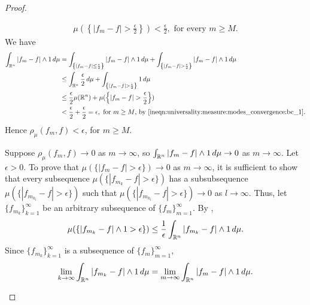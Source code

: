 \begin{proof}
\begin{step}[$b \Longrightarrow c$]
\begin{align}
     \label{ineqn:universality:measure:modes_convergence:bc_1}
     \mu (\left \{ | f_m - f | > \frac{\epsilon}{2} \right \}) < \frac{\epsilon}{2}, \text{ for every $m \geq M$.}
\end{align}
We have \begin{align*}
    \int_{{\mathbb R}^n} |f_m -f| \wedge 1 \, d\mu &=  \int_{\left \{ |f_m - f| \leq \frac{\epsilon}{2} \right \}} |f_m -f| \wedge 1  \, d\mu + \int_{\left \{ |f_m - f| > \frac{\epsilon}{2} \right \}} |f_m -f| \wedge 1  \, d\mu \\
                                          &\leq \int_{{\mathbb R}^n} \frac{\epsilon}{2} \, d\mu +   \int_{\left \{ | f_m - f | > \frac{\epsilon}{2} \right \}} 1 \, d\mu \\
                                          &\leq \frac{\epsilon}{2} \mu({\mathbb R}^n) + \mu (\left \{ | f_m - f | > \frac{\epsilon}{2}  \right \}) \\
                                          &< \frac{\epsilon}{2} + \frac{\epsilon}{2} = \epsilon, \text{ for $m \geq M$, by \ref{ineqn:universality:measure:modes_convergence:bc_1}}. 
\end{align*}
Hence $\rho_\mu (f_m, f) < \epsilon$, for $m \geq M$.
\end{step}
\begin{step}[$c \Longrightarrow b$]
Suppose $\rho_\mu (f_m, f) \to 0 $ as $m \to \infty$, so $\int_{{\mathbb R}^n} | f_m - f| \wedge 1 \, d\mu \to 0$ as $m \to \infty$. Let $\epsilon > 0$. To prove that $\mu(\{ |f_m - f| > \epsilon \}) \to 0$ as $m \to \infty$, it is sufficient to show that every subsequence $\mu(\{ |f_{m_k} - f| > \epsilon \}) $ has a subsubsequence $\mu(\{ |f_{m_{k_l}} - f| > \epsilon \})$ such that $\mu(\{ |f_{m_{k_l}} - f| > \epsilon \}) \to 0 $ as $l \to \infty$. Thus, let $\{ f_{m_k} \}_{k = 1}^\infty$ be an arbitrary subsequence of $\{ f_m \}_{m = 1}^\infty$. By ,
\begin{align}
    \label{eqn:universality:measure:modes_convergence:cb_1}
    \mu(\{ | f_{m_k} - f| \wedge 1 > \epsilon \}) \leq \frac{1}{\epsilon} \int_{{\mathbb R}^n} |f_{m_k} - f| \wedge 1 \, d\mu.
\end{align}
Since  $\{ f_{m_k} \}_{k = 1}^\infty$ is a subsequence of $\{ f_m \}_{m = 1}^\infty$, \begin{align}
    \label{eqn:universality:measure:modes_convergence:cb_2}
    \lim_{k \to \infty} \int_{\R^n}  |f_{m_k} - f| \wedge 1 \, d\mu = \lim_{m \to \infty} \int_{\R^n} |f_{m} - f| \wedge 1 \, d\mu.

\end{align}
\end{step}
\end{proof}
